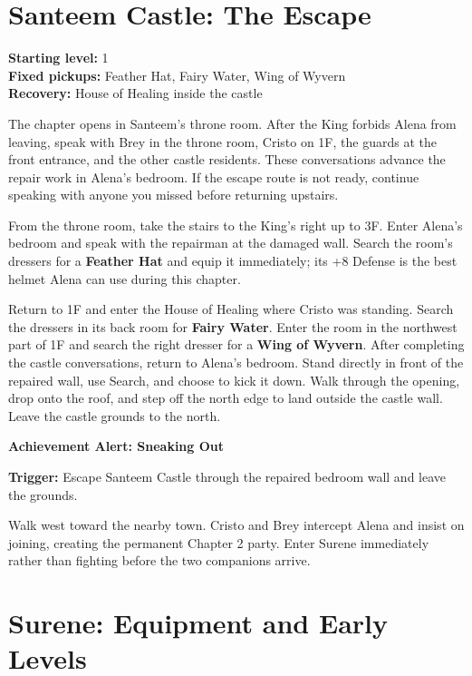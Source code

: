 \documentclass[
  american,
  10pt,
  letterpaper,
  oneside,
  open=any]{scrreprt}
\begin{document}
\section{Santeem Castle: The Escape}\label{santeem-castle-the-escape}

\textbf{Starting level:} 1\\
\textbf{Fixed pickups:} Feather Hat, Fairy Water, Wing of Wyvern\\
\textbf{Recovery:} House of Healing inside the castle

The chapter opens in Santeem's throne room. After the King forbids Alena
from leaving, speak with Brey in the throne room, Cristo on 1F, the
guards at the front entrance, and the other castle residents. These
conversations advance the repair work in Alena's bedroom. If the escape
route is not ready, continue speaking with anyone you missed before
returning upstairs.

From the throne room, take the stairs to the King's right up to 3F.
Enter Alena's bedroom and speak with the repairman at the damaged wall.
Search the room's dressers for a \textbf{Feather Hat} and equip it
immediately; its +8 Defense is the best helmet Alena can use during this
chapter.

Return to 1F and enter the House of Healing where Cristo was standing.
Search the dressers in its back room for \textbf{Fairy Water}. Enter the
room in the northwest part of 1F and search the right dresser for a
\textbf{Wing of Wyvern}. After completing the castle conversations,
return to Alena's bedroom. Stand directly in front of the repaired wall,
use Search, and choose to kick it down. Walk through the opening, drop
onto the roof, and step off the north edge to land outside the castle
wall. Leave the castle grounds to the north.

\begin{achievementalert}

\textbf{Achievement Alert: Sneaking Out}

\textbf{Trigger:} Escape Santeem Castle through the repaired bedroom
wall and leave the grounds.

\end{achievementalert}

Walk west toward the nearby town. Cristo and Brey intercept Alena and
insist on joining, creating the permanent Chapter 2 party. Enter Surene
immediately rather than fighting before the two companions arrive.

\section{Surene: Equipment and Early
Levels}\label{surene-equipment-and-early-levels}
\end{document}

